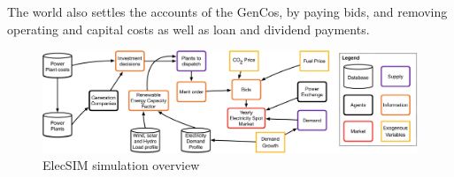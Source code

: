 
The world also settles the accounts of the GenCos, by paying bids, and removing operating and capital costs as well as loan and dividend payments.

\begin{figure}
	\centering
	\includegraphics[width=0.97\linewidth]{figures/low_level_system}
	\caption{ElecSIM simulation overview}
	\label{fig:lowlevelsystem}
\end{figure}









